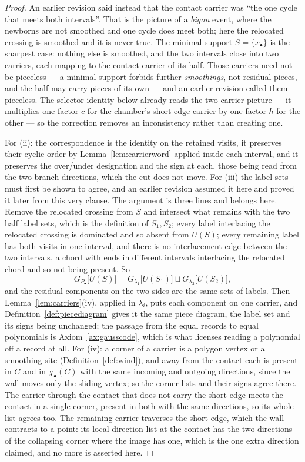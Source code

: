 \begin{proof}
An earlier revision said instead that the contact carrier was ``the one cycle
that meets both intervals''. That is the picture of a \emph{bigon} event, where
the newborns are not smoothed and one cycle does meet both; here the relocated
crossing is smoothed and it is never true. The minimal support $S=\{x_\bullet\}$
is the sharpest case: nothing else is smoothed, and the two intervals close into
two carriers, each mapping to the contact carrier of its half. Those carriers
need not be pieceless --- a minimal support forbids further \emph{smoothings},
not residual pieces, and the half may carry pieces of its own --- and an earlier
revision called them pieceless. The
selector identity below already reads the two-carrier picture --- it multiplies
one factor $c$ for the chamber's short-edge carrier by one factor $h$ for the
other --- so the correction removes an inconsistency rather than creating one.

For (ii): the correspondence is the identity on the retained visits, it
preserves their cyclic order by Lemma~\ref{lem:carrierword} applied inside each
interval, and it preserves the over/under designation and the sign at each,
those being read from the two branch directions, which the cut does not move.
For (iii) the label sets must first be shown to agree, and an earlier revision
assumed it here and proved it later from this very clause. The argument is
three lines and belongs here. Remove the relocated crossing from $S$ and
intersect what remains with the two half label sets, which is the definition of
$S_1,S_2$; every label interlacing the relocated crossing is dominated and so
absent from $U(S)$; every remaining label has both visits in one interval, and
there is no interlacement edge between the two intervals, a chord with ends in
different intervals interlacing the relocated chord and so not being present. So
\[
   G_{P_\bullet}\bigl[U(S)\bigr]=G_{\lambda_1}\bigl[U(S_1)\bigr]\sqcup
                     G_{\lambda_2}\bigl[U(S_2)\bigr],
\]
and the residual components on the two sides are the same sets of labels. Then
Lemma~\ref{lem:carriers}(iv), applied in $\lambda_i$, puts each component on
one carrier, and Definition~\ref{def:piecediagram} gives it the same piece
diagram, the label set and its signs being unchanged; the passage from the equal
records to equal polynomials is Axiom~\ref{ax:gausscode}, which is what licenses
reading a polynomial off a record at all. For (iv): a corner of a carrier is a polygon vertex or a smoothing site
(Definition~\ref{def:wind}), and away from the contact each is present in
$C$ and in $\chi_\bullet(C)$ with the same incoming and outgoing directions,
since the wall moves only the sliding vertex; so the corner lists and their
signs agree there. The carrier through the contact that does not carry the short
edge meets the contact in a single corner, present in both with the same
directions, so its whole list agrees too. The remaining carrier traverses the
short edge, which the wall contracts to a point: its local direction list at the
contact has the two directions of the collapsing corner where the image has
one, which is the one extra direction claimed, and no more is asserted here.


\end{proof}
